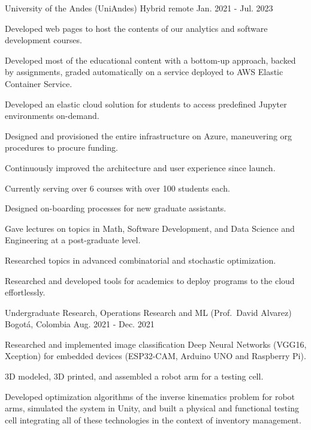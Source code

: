 \begin{cventries}
	{University of the Andes (UniAndes)} %
	{Hybrid remote} %
	{Jan. 2021 {-} Jul. 2023} %
	{
		\begin{cvitems} %
			\item {Developed web pages to host the contents of our analytics and software development courses.}
			\item {Developed most of the educational content with a bottom-up approach, backed by assignments, graded automatically on a service deployed to AWS Elastic Container Service.}
			\item {Developed an elastic cloud solution for students to access predefined Jupyter environments on-demand.}
			\item {Designed and provisioned the entire infrastructure on Azure, maneuvering org procedures to procure funding.}
			\item {Continuously improved the architecture and user experience since launch.}
			\item {Currently serving over 6 courses with over 100 students each.}
			\item {Designed on-boarding processes for new graduate assistants.}
			\item {Gave lectures on topics in Math, Software Development, and Data Science and Engineering at a post-graduate level.}
			\item {Researched topics in advanced combinatorial and stochastic optimization.}
			\item {Researched and developed tools for academics to deploy programs to the cloud effortlessly.}
		\end{cvitems}
	}

	{Undergraduate Research, Operations Research and ML (Prof.\ David Alvarez)} %
	{Bogotá, Colombia} %
	{Aug. 2021 {-} Dec. 2021} %
	{
		\begin{cvitems} %
			\item {Researched and implemented image classification Deep Neural Networks (VGG16, Xception) for embedded devices (ESP32-CAM, Arduino UNO and Raspberry Pi).}
			\item {3D modeled, 3D printed, and assembled a robot arm for a testing cell.}
			\item {Developed optimization algorithms of the inverse kinematics problem for robot arms, simulated the system in Unity, and built a physical and functional testing cell integrating all of these technologies in the context of inventory management.}
		\end{cvitems}
	}


\end{cventries}
